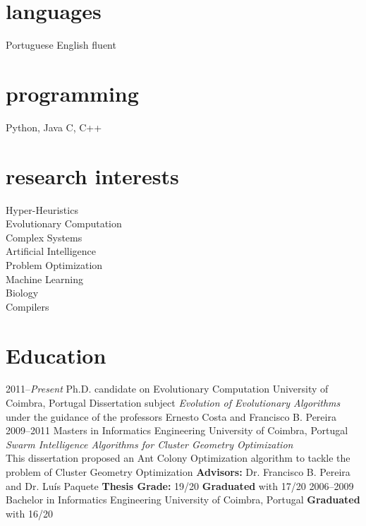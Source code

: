 \documentclass[]{friggeri-cv} %
\begin{document}
\begin{aside}
\section{languages}
Portuguese
English fluent
\section{programming}
Python, Java
C, C++
\section{research interests}
Hyper-Heuristics \\ {Evolutionary Computation} \\ Complex Systems \\ Artificial Intelligence \\ Problem Optimization \\ Machine Learning \\ Biology \\ Compilers
\end{aside}





\section{Education}

\begin{entrylist}
\entry
{2011--\emph{Present}}
{Ph.D. {\normalfont candidate on Evolutionary Computation}}
{University of Coimbra, Portugal}
{Dissertation subject \emph{Evolution of Evolutionary Algorithms} under the guidance of the professors Ernesto Costa and Francisco B. Pereira }\\
\entrymasters
{2009--2011}
{Masters {\normalfont in Informatics Engineering}}
{University of Coimbra, Portugal}
{\emph{Swarm Intelligence Algorithms for Cluster Geometry Optimization} \\ This dissertation proposed an Ant Colony Optimization algorithm to tackle the problem of Cluster Geometry Optimization}
{\textbf{Advisors:} Dr. Francisco B. Pereira and Dr. Luís Paquete}
{\textbf{Thesis Grade:} 19/20}
{\textbf{Graduated} with 17/20}
\entry
{2006--2009}
{Bachelor {\normalfont in Informatics Engineering}}
{University of Coimbra, Portugal}
{\textbf{Graduated} with 16/20}
\end{entrylist}
\end{document}
